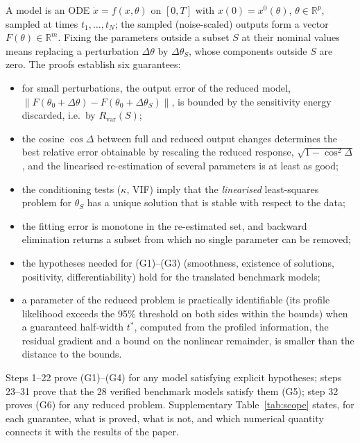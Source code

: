 A model is an ODE $\dot x=f(x,\theta)$ on $[0,T]$ with $x(0)=x^0(\theta)$, $\theta\in\mathbb{R}^p$, sampled at times $t_1,\dots,t_N$; the sampled (noise-scaled) outputs form a vector $F(\theta)\in\mathbb{R}^m$. Fixing the parameters outside a subset $S$ at their nominal values means replacing a perturbation $\Delta\theta$ by $\Delta\theta_S$, whose components outside $S$ are zero. The proofs establish six guarantees:
\begin{itemize}\itemsep0pt
\item[(G1)] for small perturbations, the output error of the reduced model, $\|F(\theta_0+\Delta\theta)-F(\theta_0+\Delta\theta_S)\|$, is bounded by the sensitivity energy discarded, i.e.\ by $R_{\mathrm{var}}(S)$;
\item[(G2)] the cosine $\cos\Delta$ between full and reduced output changes determines the best relative error obtainable by rescaling the reduced response, $\sqrt{1-\cos^2\Delta}$, and the linearised re-estimation of several parameters is at least as good;
\item[(G3)] the conditioning tests ($\kappa$, VIF) imply that the \emph{linearised} least-squares problem for $\theta_S$ has a unique solution that is stable with respect to the data;
\item[(G4)] the fitting error is monotone in the re-estimated set, and backward elimination returns a subset from which no single parameter can be removed;
\item[(G5)] the hypotheses needed for (G1)--(G3) (smoothness, existence of solutions, positivity, differentiability) hold for the translated benchmark models;
\item[(G6)] a parameter of the reduced problem is practically identifiable (its profile likelihood exceeds the 95\% threshold on both sides within the bounds) when a guaranteed half-width $t^{\ast}$, computed from the profiled information, the residual gradient and a bound on the nonlinear remainder, is smaller than the distance to the bounds.
\end{itemize}
Steps 1--22 prove (G1)--(G4) for any model satisfying explicit hypotheses; steps 23--31 prove that the 28 verified benchmark models satisfy them (G5); step 32 proves (G6) for any reduced problem. Supplementary Table~\ref{tab:scope} states, for each guarantee, what is proved, what is not, and which numerical quantity connects it with the results of the paper.

